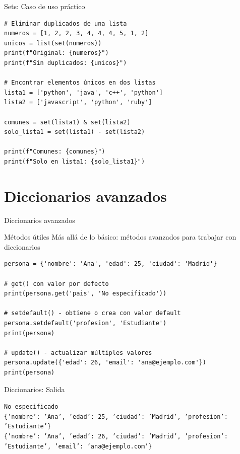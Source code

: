 \documentclass{beamer}
\begin{document}
\begin{frame}[fragile]{Sets: Caso de uso práctico \faCheckCircle}
\begin{lstlisting}
# Eliminar duplicados de una lista
numeros = [1, 2, 2, 3, 4, 4, 4, 5, 1, 2]
unicos = list(set(numeros))
print(f"Original: {numeros}")
print(f"Sin duplicados: {unicos}")

# Encontrar elementos únicos en dos listas
lista1 = ['python', 'java', 'c++', 'python']
lista2 = ['javascript', 'python', 'ruby']

comunes = set(lista1) & set(lista2)
solo_lista1 = set(lista1) - set(lista2)

print(f"Comunes: {comunes}")
print(f"Solo en lista1: {solo_lista1}")
\end{lstlisting}
\end{frame}

\section{Diccionarios avanzados}

\begin{frame}[fragile]{Diccionarios avanzados \faBook}
\begin{conceptbox}{Métodos útiles}
Más allá de lo básico: métodos avanzados para trabajar con diccionarios
\end{conceptbox}

\begin{lstlisting}
persona = {'nombre': 'Ana', 'edad': 25, 'ciudad': 'Madrid'}

# get() con valor por defecto
print(persona.get('pais', 'No especificado'))

# setdefault() - obtiene o crea con valor default
persona.setdefault('profesion', 'Estudiante')
print(persona)

# update() - actualizar múltiples valores
persona.update({'edad': 26, 'email': 'ana@ejemplo.com'})
print(persona)
\end{lstlisting}
\end{frame}

\begin{frame}[fragile]{Diccionarios: Salida \faArrowCircleRight}
\begin{tcolorbox}[colback=green!10,colframe=green,title={\small\faArrowCircleRight \ Salida},coltitle=fg0,left=3pt,right=3pt,top=2pt,bottom=2pt,boxsep=1pt]
\tiny\texttt{No especificado\\
\{'nombre': 'Ana', 'edad': 25, 'ciudad': 'Madrid', 'profesion': 'Estudiante'\}\\
\{'nombre': 'Ana', 'edad': 26, 'ciudad': 'Madrid', 'profesion': 'Estudiante', 'email': 'ana@ejemplo.com'\}}
\end{tcolorbox}
\end{frame}
\end{document}
